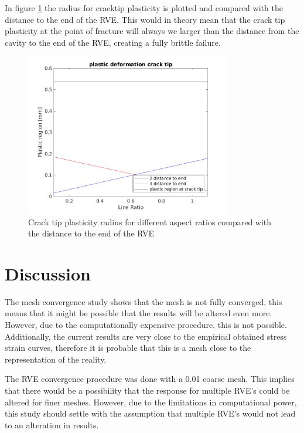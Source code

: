 In figure \ref{fig:cracktip} the radius for cracktip plasticity is plotted and compared with the distance to the end of the RVE. This would in theory mean that the crack tip plasticity at the point of fracture will always we larger than the distance from the cavity to the end of the RVE, creating a fully brittle failure.  
\begin{figure}[H]
    \centering
    \includegraphics[width=0.80\textwidth]{chapter_7_non-elasticmodelling/figures/cracktip.png}
    \caption{Crack tip plasticity radius for different aspect ratios compared with the distance to the end of the RVE}
    \label{fig:cracktip}
\end{figure}


\section{Discussion}
The mesh convergence study shows that the mesh is not fully converged, this means that it might be possible that the results will be altered even more. However, due to the computationally expensive procedure, this is not possible. Additionally, the current results are very close to the empirical obtained stress strain curves, therefore it is probable that this is a mesh close to the representation of the reality. 

The RVE convergence procedure was done with a 0.01 coarse mesh. This implies that there would be a possibility that the response for multiple RVE's could be altered for finer meshes. However, due to the limitations in computational power, this study should settle with the assumption that multiple RVE's would not lead to an alteration in results.  

